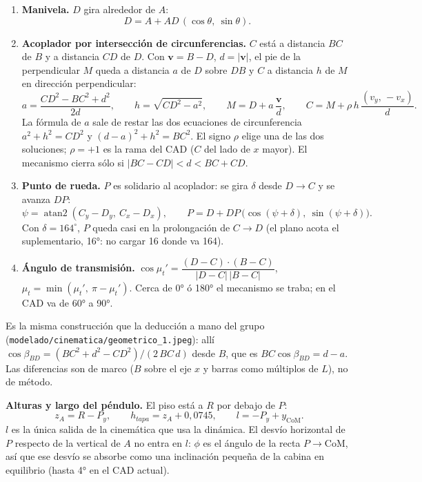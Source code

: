 \documentclass[11pt,a4paper]{article}
\newcommand{\code}[1]{\texttt{#1}}
\newcommand{\atan}{\operatorname{atan2}}
\begin{document}
\begin{enumerate}\itemsep3pt
  \item \textbf{Manivela.} $D$ gira alrededor de $A$:
  \begin{equation}
    D = A + AD\,(\cos\theta,\ \sin\theta).
    \label{eq:D}
  \end{equation}
  \item \textbf{Acoplador por intersección de circunferencias.} $C$ está a distancia $BC$ de $B$ y a
  distancia $CD$ de $D$. Con $\bm v = B - D$, $d = |\bm v|$, el pie de la perpendicular $M$ queda a
  distancia $a$ de $D$ sobre $DB$ y $C$ a distancia $h$ de $M$ en dirección perpendicular:
  \begin{equation}
    a = \frac{CD^2 - BC^2 + d^2}{2d}, \qquad h = \sqrt{CD^2 - a^2}, \qquad
    M = D + a\,\frac{\bm v}{d}, \qquad C = M + \rho\, h\,\frac{(v_y,\,-v_x)}{d}.
    \label{eq:C}
  \end{equation}
  La fórmula de $a$ sale de restar las dos ecuaciones de circunferencia $a^2 + h^2 = CD^2$ y
  $(d-a)^2 + h^2 = BC^2$. El signo $\rho$ elige una de las dos soluciones; $\rho = +1$ es la rama del
  CAD ($C$ del lado de $x$ mayor). El mecanismo cierra sólo si $|BC - CD| < d < BC + CD$.
  \item \textbf{Punto de rueda.} $P$ es solidario al acoplador: se gira $\delta$ desde $D\!\to\!C$ y se
  avanza $DP$:
  \begin{equation}
    \psi = \atan(C_y - D_y,\ C_x - D_x), \qquad P = D + DP\,\big(\cos(\psi+\delta),\ \sin(\psi+\delta)\big).
    \label{eq:P}
  \end{equation}
  Con $\delta = 164^\circ$, $P$ queda casi en la prolongación de $C\!\to\!D$ (el plano acota el
  suplementario, 16°: no cargar 16 donde va 164).
  \item \textbf{Ángulo de transmisión.} $\cos\mu_t' = \dfrac{(D-C)\cdot(B-C)}{|D-C|\,|B-C|}$,
  $\mu_t = \min(\mu_t',\ \pi - \mu_t')$. Cerca de 0° ó 180° el mecanismo se traba; en el CAD va de 60° a 90°.
\end{enumerate}

Es la misma construcción que la deducción a mano del grupo (\code{modelado/cinematica/geometrico\_1.jpeg}):
allí $\cos\beta_{BD} = (BC^2 + d^2 - CD^2)/(2\,BC\,d)$ desde $B$, que es $BC\cos\beta_{BD} = d - a$.
Las diferencias son de marco ($B$ sobre el eje $x$ y barras como múltiplos de $L$), no de método.

\textbf{Alturas y largo del péndulo.} El piso está a $R$ por debajo de $P$:
\begin{equation}
  z_A = R - P_y, \qquad h_{tapa} = z_A + 0{,}0745, \qquad l = -P_y + y_{\mathrm{CoM}} .
  \label{eq:l}
\end{equation}
$l$ es la única salida de la cinemática que usa la dinámica. El desvío horizontal de $P$ respecto de la
vertical de $A$ no entra en $l$: $\phi$ es el ángulo de la recta $P\!\to\!\mathrm{CoM}$, así que ese desvío
se absorbe como una inclinación pequeña de la cabina en equilibrio (hasta 4° en el CAD actual).
\end{document}
